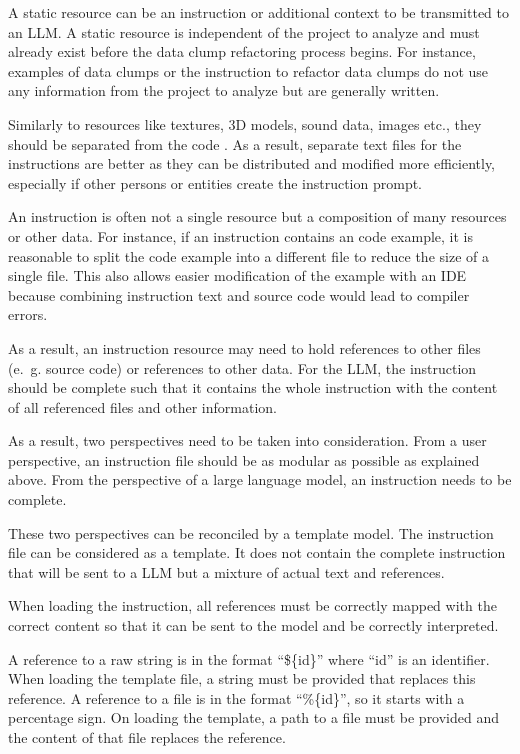 A static resource can be an instruction or additional context to be transmitted to an \ac{LLM}. A static resource is independent of the project to analyze and must already exist before the data clump refactoring process begins. For instance, examples of data clumps or the instruction to refactor data clumps do not use any information from the project to analyze but are generally written. 

 Similarly to resources like textures, 3D models, sound data, images etc., they should be separated from the code \cite{separate_code_data}. As a result, separate text files for the instructions are better as they can be distributed and modified more efficiently, especially if other persons or entities create the instruction prompt.

An instruction is often not a single resource but a composition of many resources or other data. For instance, if an instruction contains an code example, it is reasonable to split the code example into a different file to reduce the size of a single file. This  also allows easier modification of the example with an \ac{IDE} because combining instruction text and source code would lead to compiler errors.

As a result, an instruction resource may need to hold references to other files (e.~g. source code) or references to other data.
For the \ac{LLM}, the instruction should be complete such that it contains the whole instruction with the content of all referenced files and other information.

As a result, two perspectives need to be taken into consideration. From a user perspective, an instruction file should be as modular as possible as explained above. From the perspective of a large language model, an instruction needs to be complete. 

These two perspectives can be reconciled by a template model. The instruction file can be considered as a template. It does not contain the complete instruction that will be sent to a \ac{LLM} but a mixture of actual text and references.

When loading the instruction, all references must be correctly mapped with the correct content so that it can be sent to the model and be correctly interpreted. 

A reference to a raw string is in the format \enquote{\$\{id\}} where \enquote{id} is an identifier. When loading the template file, a string must be provided that replaces this reference.  A reference to a file is in the format \enquote{\%\{id\}}, so it starts with a percentage sign. On loading the template, a path to a file must be  provided and the content of that file replaces the reference. 

